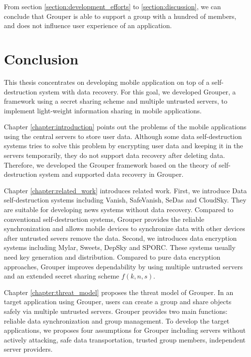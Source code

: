 \documentclass[a4paper,11pt]{report}
\begin{document}
From section \ref{section:development_efforts} to \ref{section:discussion}, we can conclude that Grouper is able to support a group with a hundred of members, and does not influence user experience of an application.

\chapter{Conclusion} \label{chapter:conclusion}

This thesis concentrates on developing mobile application on top of a self-destruction system with data recovery.
For this goal, we developed Grouper, a framework using a secret sharing scheme and multiple untrusted servers, to implement light-weight information sharing in mobile applications.

Chapter \ref{chapter:introduction} points out the problems of the mobile applications using the central servers to store user data.
Although some data self-destruction systems tries to solve this problem by encrypting user data and keeping it in the servers temporarily, they do not support data recovery after deleting data.
Therefore, we developed the Grouper framework based on the theory of self-destruction system and supported data recovery in Grouper.

Chapter \ref{chapter:related_work} introduces related work.
First, we introduce Data self-destruction systems including Vanish, SafeVanish, SeDas and CloudSky.
They are suitable for developing news systems without data recovery.
Compared to conventional self-destruction systems, Grouper provides the reliable synchronization and allows mobile devices to synchronize data with other devices after untrusted severs remove the data.
Second, we introduces data encryption systems including Mylar, Sweets, DepSky and SPORC.
These systems usually need key generation and distribution.
Compared to pure data encryption approaches, Grouper improves dependability by using multiple untrusted servers and an extended secret sharing scheme $f(k, n, s)$.

Chapter \ref{chapter:threat_model} proposes the threat model of Grouper.
In an target application using Grouper, users can create a group and share objects safely via multiple untrusted servers.
Grouper provides two main functions: reliable data synchronization and group management.
To develop the target applications, we proposes four assumptions for Grouper including servers without actively attacking, safe data transportation, trusted group members, independent server providers.
\end{document}
